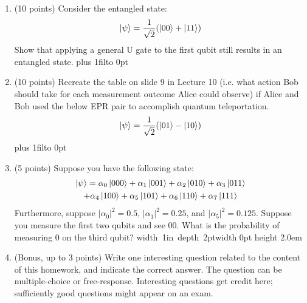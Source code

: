 \documentclass[12pt]{article}
\newcommand{\Blank}{\mbox{\hskip 4pt\vrule width 1in depth 2pt}\vrule width 0pt height 2.0em}
\def\DefaultSpace{1in}
\newcommand{\LeaveSpace}[1][\DefaultSpace]{%
\vskip #1 plus 1fil\relax\hbox to 0pt{\hss} %
}
\begin{document}
\begin{enumerate}[font=\bfseries]
    \item (10 points) Consider the entangled state: 
    \[\ket{\psi} = \frac{1}{\sqrt{2}}(\ket{00}+\ket{11})\]
    Show that applying a general U gate to the first qubit still results in an entangled state. \LeaveSpace[2.5in]
    \item (10 points) Recreate the table on slide 9 in Lecture 10 (i.e. what action Bob should take for each measurement outcome Alice could observe) if Alice and Bob used the below EPR pair to accomplish quantum teleportation.
    \[\ket{\psi} = \frac{1}{\sqrt{2}}(\ket{01}-\ket{10})\]
    \LeaveSpace[2.25in]
    \item (5 points) Suppose you have the following state:
    \begin{multline} \ket{\psi} = 
        \alpha_0\ket{000} + \alpha_1\ket{001} +
                    \alpha_2\ket{010} + \alpha_3\ket{011}  \\
                    + \alpha_4\ket{100} + \alpha_5\ket{101} +
                    \alpha_6\ket{110} + \alpha_7\ket{111}
    \end{multline}
    Furthermore, suppose $|\alpha_0|^2 = 0.5$, $|\alpha_1|^2 = 0.25$, and $|\alpha_5|^2 = 0.125$. Suppose you measure the first two qubits and see $00$. What is the probability of measuring 0 on the third qubit? \Blank{}
    \newpage
    \item (Bonus, up to 3 points) Write one interesting question related to the content of this homework, and indicate the correct answer. The question can be multiple-choice or free-response.  Interesting questions get credit here;  sufficiently good questions might appear on an exam.
\end{enumerate}
\end{document}

